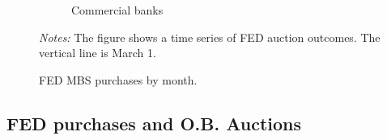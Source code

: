 \documentclass[11pt,a4paper]{article}
\begin{document}
\begin{figure}[h]
\begin{subfigure}[b]{0.7\textwidth}
        \caption{ Commercial banks } 
       \end{subfigure}
       \caption{FED MBS purchases by month.}\label{fig:fed_mbs_amount_by_month}
     \begin{minipage}{\textwidth}
        \footnotesize{\textit{Notes:} The figure shows a time series of FED auction outcomes. The vertical line is March 1.  } 
        \end{minipage}
  \end{figure}



\pagebreak

\subsection{FED purchases and O.B. Auctions}
\end{document}
